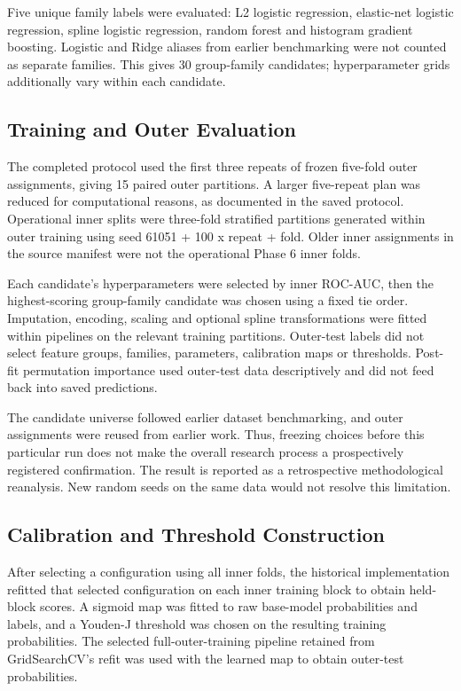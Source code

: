 \documentclass[conference]{IEEEtran}
\begin{document}
Five unique family labels were evaluated: L2 logistic regression, elastic-net logistic regression, spline logistic regression, random forest and histogram gradient boosting. Logistic and Ridge aliases from earlier benchmarking were not counted as separate families. This gives 30 group-family candidates; hyperparameter grids additionally vary within each candidate.

\subsection{Training and Outer Evaluation}
The completed protocol used the first three repeats of frozen five-fold outer assignments, giving 15 paired outer partitions. A larger five-repeat plan was reduced for computational reasons, as documented in the saved protocol. Operational inner splits were three-fold stratified partitions generated within outer training using seed 61051 + 100 x repeat + fold. Older inner assignments in the source manifest were not the operational Phase 6 inner folds.

Each candidate's hyperparameters were selected by inner ROC-AUC, then the highest-scoring group-family candidate was chosen using a fixed tie order. Imputation, encoding, scaling and optional spline transformations were fitted within pipelines on the relevant training partitions. Outer-test labels did not select feature groups, families, parameters, calibration maps or thresholds. Post-fit permutation importance used outer-test data descriptively and did not feed back into saved predictions.

The candidate universe followed earlier dataset benchmarking, and outer assignments were reused from earlier work. Thus, freezing choices before this particular run does not make the overall research process a prospectively registered confirmation. The result is reported as a retrospective methodological reanalysis. New random seeds on the same data would not resolve this limitation.

\subsection{Calibration and Threshold Construction}
After selecting a configuration using all inner folds, the historical implementation refitted that selected configuration on each inner training block to obtain held-block scores. A sigmoid map was fitted to raw base-model probabilities and labels, and a Youden-J threshold was chosen on the resulting training probabilities. The selected full-outer-training pipeline retained from GridSearchCV's refit was used with the learned map to obtain outer-test probabilities.
\end{document}
